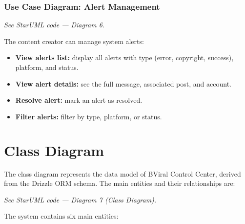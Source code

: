 \subsubsection*{Use Case Diagram: Alert Management}

\noindent\textit{See StarUML code --- Diagram 6.}

The content creator can manage system alerts:
\begin{itemize}
    \item \textbf{View alerts list:} display all alerts with type (error, copyright, success), platform, and status.
    \item \textbf{View alert details:} see the full message, associated post, and account.
    \item \textbf{Resolve alert:} mark an alert as resolved.
    \item \textbf{Filter alerts:} filter by type, platform, or status.
\end{itemize}

\section{Class Diagram}

The class diagram represents the data model of BViral Control Center, derived from the Drizzle ORM schema. The main entities and their relationships are:

\noindent\textit{See StarUML code --- Diagram 7 (Class Diagram).}


The system contains six main entities:

